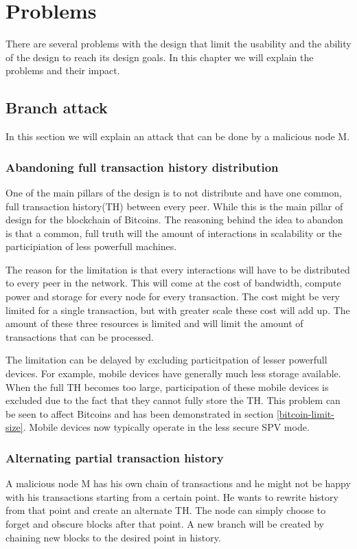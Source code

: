 \chapter{Problems}
There are several problems with the design that limit the usability
and the ability of the design to reach its design goals.
In this chapter we will explain the problems and their impact.

\section{Branch attack}
In this section we will explain an attack that can be done by a malicious node M.

\subsection{Abandoning full transaction history distribution}
One of the main pillars of the design is to not distribute
and have one common, full transaction history(TH) between every peer.
While this is the main pillar of design for the blockchain of Bitcoins.
The reasoning behind the idea to abandon is that a common, full truth
will the amount of interactions in scalability or the participiation of less powerfull machines.

The reason for the limitation is that every interactions will have to be distributed to every peer in the network.
This will come at the cost of bandwidth, compute power and storage for every node for every transaction.
The cost might be very limited for a single transaction,
but with greater scale these cost will add up.
The amount of these three resources is limited and will limit the amount of transactions that can be processed.

The limitation can be delayed by excluding particitpation of lesser powerfull devices.
For example, mobile devices have generally much less storage available.
When the full TH becomes too large,
participation of these mobile devices is excluded due to the fact that they cannot fully store the TH.
This problem can be seen to affect Bitcoins and has been demonstrated in section \ref{bitcoin-limit-size}.
Mobile devices now typically operate in the less secure SPV mode.

\subsection{Alternating partial transaction history}
A malicious node M has his own chain of transactions
and he might not be happy with his transactions starting from a certain point.
He wants to rewrite history from that point and create an alternate TH.
The node can simply choose to forget and obscure blocks after that point.
A new branch will be created by chaining new blocks to the desired point in history.

